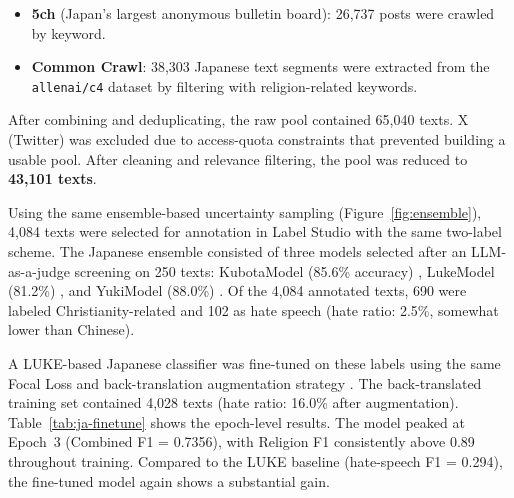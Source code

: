 \documentclass[../CLthesis.tex]{subfiles}
\begin{document}
\begin{itemize}
  \item \textbf{5ch} (Japan's largest anonymous bulletin board): 26,737 posts were crawled by keyword.
  \item \textbf{Common Crawl}: 38,303 Japanese text segments were extracted from the \texttt{allenai/c4} dataset \cite{xue2021mt5massivelymultilingualpretrained, raffel2023exploringlimitstransferlearning} by filtering with religion-related keywords.
\end{itemize}

After combining and deduplicating, the raw pool contained 65,040 texts. X (Twitter) was excluded due to access-quota constraints that prevented building a usable pool. After cleaning and relevance filtering, the pool was reduced to \textbf{43,101 texts}.

Using the same ensemble-based uncertainty sampling (Figure~\ref{fig:ensemble}), 4,084 texts were selected for annotation in Label Studio with the same two-label scheme. The Japanese ensemble consisted of three models selected after an LLM-as-a-judge screening on 250 texts: KubotaModel (85.6\% accuracy) \citep{yamada2020luke}, LukeModel (81.2\%) \citep{luke-japanese}, and YukiModel (88.0\%) \citep{rinna-japanese-gpt-neox-3.6b-instruction-ppo, sawada2024release}. Of the 4,084 annotated texts, 690 were labeled Christianity-related and 102 as hate speech (hate ratio: 2.5\%, somewhat lower than Chinese).

A LUKE-based Japanese classifier was fine-tuned on these labels using the same Focal Loss and back-translation augmentation strategy \citep{luke-japanese}. The back-translated training set contained 4,028 texts (hate ratio: 16.0\% after augmentation). Table~\ref{tab:ja-finetune} shows the epoch-level results. The model peaked at Epoch~3 (Combined F1 = 0.7356), with Religion F1 consistently above 0.89 throughout training. Compared to the LUKE baseline (hate-speech F1 = 0.294), the fine-tuned model again shows a substantial gain.
\end{document}
